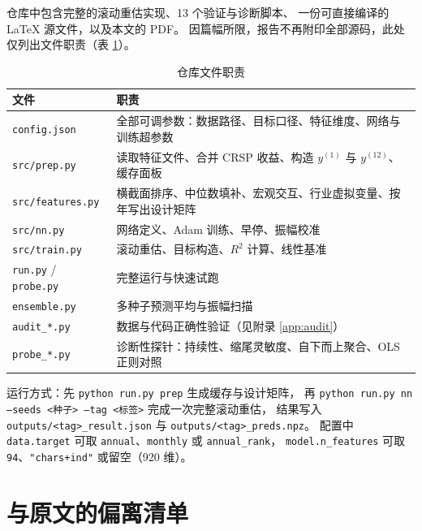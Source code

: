 \documentclass[11pt,a4paper,fontset=windows]{ctexart}
\newcommand{\code}[1]{\texttt{#1}}
\begin{document}
仓库中包含完整的滚动重估实现、13 个验证与诊断脚本、
一份可直接编译的 \LaTeX{} 源文件，以及本文的 PDF。
因篇幅所限，报告不再附印全部源码，此处仅列出文件职责（表 \ref{tab:files}）。

\begin{table}[htbp]
\centering
\caption{仓库文件职责}
\label{tab:files}
\small
\begin{tabular}{p{4.6cm}p{9.4cm}}
\toprule
文件 & 职责 \\
\midrule
\code{config.json} & 全部可调参数：数据路径、目标口径、特征维度、网络与训练超参数 \\
\code{src/prep.py} & 读取特征文件、合并 CRSP 收益、构造 $y^{(1)}$ 与 $y^{(12)}$、缓存面板 \\
\code{src/features.py} & 横截面排序、中位数填补、宏观交互、行业虚拟变量、按年写出设计矩阵 \\
\code{src/nn.py} & 网络定义、Adam 训练、早停、振幅校准 \\
\code{src/train.py} & 滚动重估、目标构造、$R^2$ 计算、线性基准 \\
\code{run.py} / \code{probe.py} & 完整运行与快速试跑 \\
\code{ensemble.py} & 多种子预测平均与振幅扫描 \\
\code{audit\_*.py} & 数据与代码正确性验证（见附录 \ref{app:audit}） \\
\code{probe\_*.py} & 诊断性探针：持续性、缩尾灵敏度、自下而上聚合、OLS 正则对照 \\
\bottomrule
\end{tabular}
\end{table}

运行方式：先 \code{python run.py prep} 生成缓存与设计矩阵，
再 \code{python run.py nn --seeds <种子> --tag <标签>} 完成一次完整滚动重估，
结果写入 \code{outputs/<tag>\_result.json} 与 \code{outputs/<tag>\_preds.npz}。
配置中 \code{data.target} 可取 \code{annual}、\code{monthly} 或 \code{annual\_rank}，
\code{model.n\_features} 可取 \code{94}、\code{"chars+ind"} 或留空（920 维）。

\section{与原文的偏离清单}\label{app:deviation}
\end{document}
